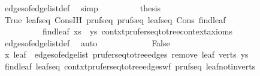 \begin{isabellebody}
\ edges{\isacharunderscore}{\kern0pt}of{\isacharunderscore}{\kern0pt}edge{\isacharunderscore}{\kern0pt}list{\isacharunderscore}{\kern0pt}def\ \isamarkupfalse%
\ simp\isanewline
\ \ \ \ \ \ \isamarkupfalse%
\ \isamarkupfalse%
\ {\isacharquery}{\kern0pt}thesis\ \isamarkupfalse%
\ True\ leafs{\isacharunderscore}{\kern0pt}eq\ Cons{\isachardot}{\kern0pt}IH\ pruf{\isacharunderscore}{\kern0pt}seq{}{\isacharprime}{\kern0pt}\ pruf{\isacharunderscore}{\kern0pt}seq{}{\isacharprime}{\kern0pt}\ leafs{\isacharunderscore}{\kern0pt}eq\ Cons{\isacharparenleft}{\kern0pt}{}{\isacharparenright}{\kern0pt}\ find{\isacharunderscore}{\kern0pt}leaf\isanewline
\ \ \ \ \ \ \ \ \ \ find{\isacharunderscore}{\kern0pt}leaf{}\ {\isacartoucheopen}xs\ {\isasymnoteq}\ ys{\isacartoucheclose}\ contxt{\isacharprime}{\kern0pt}{\isachardot}{\kern0pt}prufer{\isacharunderscore}{\kern0pt}seq{\isacharunderscore}{\kern0pt}to{\isacharunderscore}{\kern0pt}tree{\isacharunderscore}{\kern0pt}context{\isacharunderscore}{\kern0pt}axioms\ \isamarkupfalse%
\ edges{\isacharunderscore}{\kern0pt}of{\isacharunderscore}{\kern0pt}edge{\isacharunderscore}{\kern0pt}list{\isacharunderscore}{\kern0pt}def\ \isamarkupfalse%
\ auto\isanewline
\ \ \ \ \isamarkupfalse%
\isanewline
\ \ \ \ \ \ \isamarkupfalse%
\ False\isanewline
\ \ \ \ \ \ \isamarkupfalse%
\ \isamarkupfalse%
\ {\isachardoublequoteopen}{\isacharbraceleft}{\kern0pt}x{\isacharcomma}{\kern0pt}\ leaf{\isacharbraceright}{\kern0pt}\ {\isasymnotin}\ edges{\isacharunderscore}{\kern0pt}of{\isacharunderscore}{\kern0pt}edge{\isacharunderscore}{\kern0pt}list\ {\isacharparenleft}{\kern0pt}prufer{\isacharunderscore}{\kern0pt}seq{\isacharunderscore}{\kern0pt}to{\isacharunderscore}{\kern0pt}tree{\isacharunderscore}{\kern0pt}edges\ {\isacharparenleft}{\kern0pt}remove{}\ leaf\ verts{\isacharparenright}{\kern0pt}\ ys{\isacharparenright}{\kern0pt}{\isachardoublequoteclose}\ \isamarkupfalse%
\ find{\isacharunderscore}{\kern0pt}leaf{}\ leafs{\isacharunderscore}{\kern0pt}eq\ contxt{\isacharprime}{\kern0pt}{\isachardot}{\kern0pt}prufer{\isacharunderscore}{\kern0pt}seq{\isacharunderscore}{\kern0pt}to{\isacharunderscore}{\kern0pt}tree{\isacharunderscore}{\kern0pt}edges{\isacharunderscore}{\kern0pt}wf\ pruf{\isacharunderscore}{\kern0pt}seq{}{\isacharprime}{\kern0pt}\ leaf{\isacharunderscore}{\kern0pt}not{\isacharunderscore}{\kern0pt}in{\isacharunderscore}{\kern0pt}verts{\isacharprime}{\kern0pt}\ \isamarkupfalse%

\end{isabellebody}

